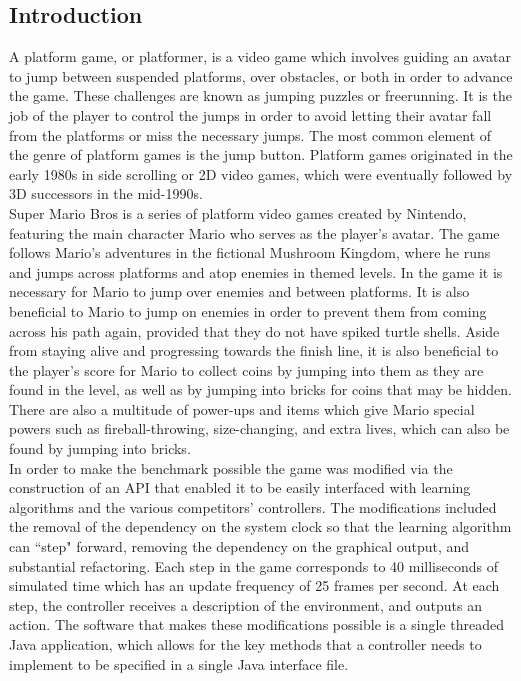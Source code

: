 \documentclass[12pt]{article}
\begin{document}
\setlength{\columnsep}{.65cm}
\begin{multicols}{2}
\section * {Introduction}
A platform game, or platformer, is a video game which involves guiding an avatar to jump between suspended platforms, over obstacles, or both in order to advance the game. These challenges are known as jumping puzzles or freerunning. It is the job of the player to control the jumps in order to avoid letting their avatar fall from the platforms or miss the necessary jumps. The most common element of the genre of platform games is the jump button. Platform games originated in the early 1980s in side scrolling or 2D video games, which were eventually followed by 3D successors in the mid-1990s.
\\
\indent Super Mario Bros is a series of platform video games created by Nintendo, featuring the main character Mario who serves as the player's avatar. The game follows Mario's adventures in the fictional Mushroom Kingdom, where he runs and jumps across platforms and atop enemies in themed levels. In the game it is necessary for Mario to jump over enemies and between platforms. It is also beneficial to Mario to jump on enemies in order to prevent them from coming across his path again, provided that they do not have spiked turtle shells. Aside from staying alive and progressing towards the finish line, it is also beneficial to the player's score for Mario to collect coins by jumping into them as they are found in the level, as well as by jumping into bricks for coins that may be hidden. There are also a multitude of power-ups and items which give Mario special powers such as fireball-throwing, size-changing, and extra lives, which can also be found by jumping into bricks.
\\
\indent In order to make the benchmark possible the game was modified via the construction of an API that enabled it to be easily interfaced with learning algorithms and the various competitors' controllers. The modifications included the removal of the dependency on the system clock so that the learning algorithm can ``step" forward, removing the dependency on the graphical output, and substantial refactoring. Each step in the game corresponds to 40 milliseconds of simulated time which has an update frequency of 25 frames per second. At each step, the controller receives a description of the environment, and outputs an action. The software that makes these modifications possible is a single threaded Java application, which allows for the key methods that a controller needs to implement to be specified in a single Java interface file.

\end{multicols}
\end{document}
